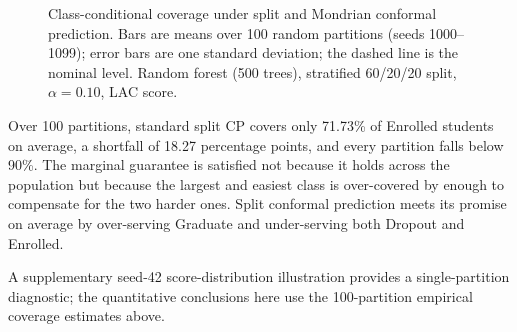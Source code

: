 \begin{figure}[htbp]
\centering
{}
\caption{Class-conditional coverage under split and Mondrian conformal
prediction. Bars are means over 100 random partitions (seeds 1000--1099); error bars are one
standard deviation; the dashed line is the nominal level. Random forest
(500 trees), stratified 60/20/20 split, $\alpha = 0.10$, LAC score.}
\label{fig:coverage}
\end{figure}

Over 100 partitions, standard split CP covers only 71.73\% of \textsf{Enrolled}
students on average, a shortfall of 18.27 percentage points, and every
partition falls below 90\%. The marginal guarantee is satisfied not because it holds across the
population but because the largest and easiest class is over-covered by enough
to compensate for the two harder ones. Split conformal prediction meets its
promise on average by over-serving \textsf{Graduate} and under-serving both
\textsf{Dropout} and \textsf{Enrolled}.

A supplementary seed-42 score-distribution illustration provides a
single-partition diagnostic; the quantitative conclusions here use the
100-partition empirical coverage estimates above.

